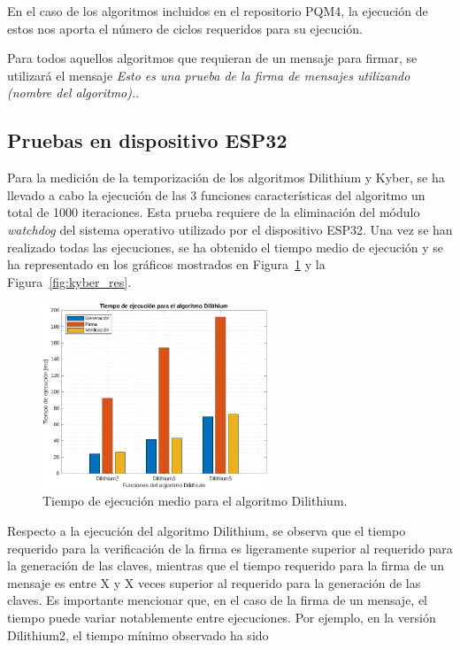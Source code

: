 En el caso de los algoritmos incluidos en el repositorio PQM4, la ejecución de estos nos aporta el número de ciclos requeridos para su ejecución.

Para todos aquellos algoritmos que requieran de un mensaje para firmar, se utilizará el mensaje \textit{Esto es una prueba de la firma de mensajes utilizando (nombre del algoritmo).}.

\subsection{Pruebas en dispositivo ESP32}\label{subsec:esp32_res}

Para la medición de la temporización de los algoritmos Dilithium y Kyber, se ha llevado a cabo la ejecución de las 3 funciones características del algoritmo un total de 1000 iteraciones.
Esta prueba requiere de la eliminación del módulo \textit{watchdog} del sistema operativo utilizado por el dispositivo ESP32.
Una vez se han realizado todas las ejecuciones, se ha obtenido el tiempo medio de ejecución y se ha representado en los gráficos mostrados en Figura~\ref{fig:dilihtium_res} y la Figura~\ref{fig:kyber_res}.

\begin{figure}[h]
    \centering
    \includegraphics[width=0.6\textwidth]{figures/Dilithium.pdf}
    \caption{Tiempo de ejecución medio para el algoritmo Dilithium.}
    \label{fig:dilihtium_res}
\end{figure}

Respecto a la ejecución del algoritmo Dilithium, se observa que el tiempo requerido para la verificación de la firma es ligeramente superior al requerido para la generación de las claves, mientras que el tiempo requerido para la firma de un mensaje es entre X y X veces superior al requerido para la generación de las claves. %
Es importante mencionar que, en el caso de la firma de un mensaje, el tiempo puede variar notablemente entre ejecuciones.
Por ejemplo, en la versión Dilithium2, el tiempo mínimo observado ha sido %

